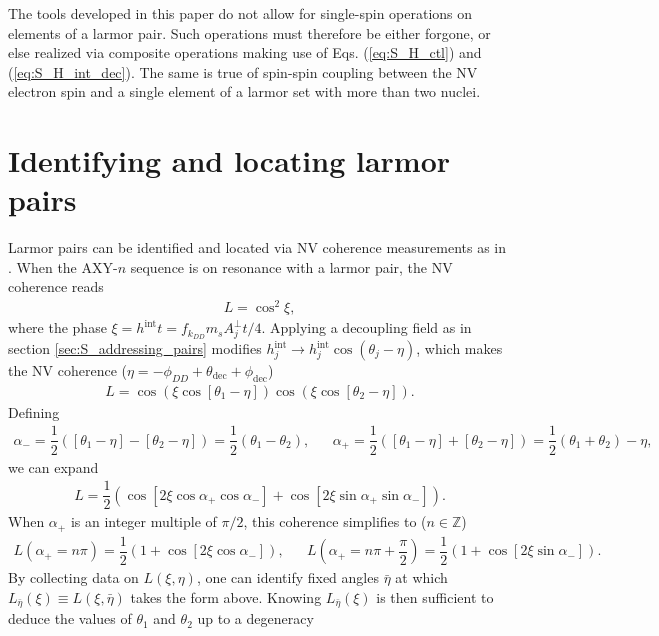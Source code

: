 \documentclass[twocolumn]{revtex4-1}
\renewcommand{\t}{\text} %
\newcommand{\f}[2]{\dfrac{#1}{#2}} %
\newcommand{\p}[1]{\left(#1\right)} %
\renewcommand{\sp}[1]{\left[#1\right]} %
\begin{document}
The tools developed in this paper do not allow for single-spin
operations on elements of a larmor pair. Such operations must
therefore be either forgone, or else realized via composite operations
making use of Eqs. (\ref{eq:S_H_ctl}) and (\ref{eq:S_H_int_dec}). The
same is true of spin-spin coupling between the NV electron spin and a
single element of a larmor set with more than two nuclei.


\section{Identifying and locating larmor pairs}
\label{sec:S_locating_pairs}

Larmor pairs can be identified and located via NV coherence
measurements as in \cite{wang2016positioning}. When the AXY-$n$
sequence is on resonance with a larmor pair, the NV coherence reads
\begin{align}
  L = \cos^2\xi,
\end{align}
where the phase $\xi = h^{\t{int}}t = f_{k_{DD}}m_sA_j^\perp t/4$.
Applying a decoupling field as in section \ref{sec:S_addressing_pairs}
modifies $h_j^{\t{int}}\to h_j^{\t{int}}\cos\p{\theta_j-\eta}$, which
makes the NV coherence
($\eta=-\phi_{DD}+\theta_{\t{dec}}+\phi_{\t{dec}}$)
\begin{align}
  L
  = \cos\p{\xi\cos\sp{\theta_1-\eta}}\cos\p{\xi\cos\sp{\theta_2-\eta}}.
\end{align}
Defining
\begin{align}
  \alpha_- = \f12\p{\sp{\theta_1-\eta}-\sp{\theta_2-\eta}}
  = \f12\p{\theta_1-\theta_2},
  && \alpha_+ = \f12\p{\sp{\theta_1-\eta}+\sp{\theta_2-\eta}}
     = \f12\p{\theta_1+\theta_2} - \eta,
\end{align}
we can expand
\begin{align}
  L
  = \f12\p{\cos\sp{2\xi\cos\alpha_+\cos\alpha_-}
  + \cos\sp{2\xi\sin\alpha_+\sin\alpha_-}}.
\end{align}
When $\alpha_+$ is an integer multiple of $\pi/2$, this coherence
simplifies to ($n\in\mathbb Z$)
\begin{align}
  \label{eq:S_L_simplified}
  L\p{\alpha_+=n\pi} = \f12\p{1 + \cos\sp{2\xi\cos\alpha_-}},
  && L\p{\alpha_+=n\pi+\f\pi2}
     = \f12\p{1 + \cos\sp{2\xi\sin\alpha_-}}.
\end{align}
By collecting data on $L\p{\xi,\eta}$, one can identify fixed angles
$\bar\eta$ at which $L_{\bar\eta}\p\xi\equiv L\p{\xi,\bar\eta}$ takes
the form above. Knowing $L_{\bar\eta}\p\xi$ is then sufficient to
deduce the values of $\theta_1$ and $\theta_2$ up to a degeneracy
\end{document}
